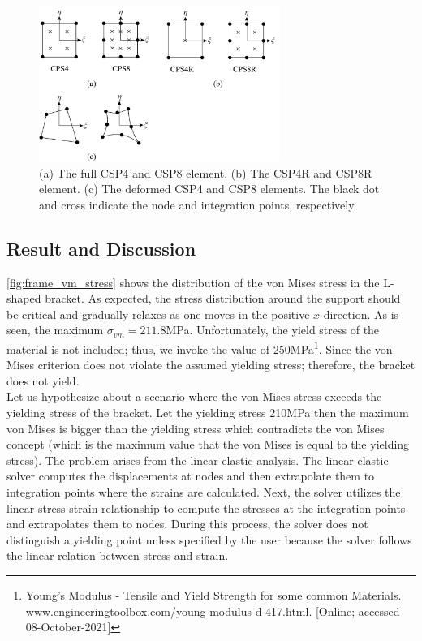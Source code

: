 \documentclass{article}
\begin{document}
\begin{figure}[H]
    \centering
    \includegraphics[width = 0.7\textwidth ]{figures/element.pdf}
    \caption{(a) The full CSP4 and CSP8 element. (b) The CSP4R and CSP8R element. (c) The deformed CSP4 and CSP8 elements. The black dot and cross indicate the node and integration points, respectively.}
    \label{fig:element}
\end{figure}

\subsection{Result and Discussion}
\cref{fig:frame_vm_stress} shows the distribution of the von Mises stress in the L-shaped bracket. As expected, the stress distribution around the support should be critical and gradually relaxes as one moves in the positive $x$-direction. As is seen, the maximum $\sigma_{vm} = 211.8$MPa. Unfortunately, the yield stress of the material is not included; thus, we invoke the value of 250MPa\footnote{Young's Modulus - Tensile and Yield Strength for some common Materials. www.engineeringtoolbox.com/young-modulus-d-417.html. [Online; accessed 08-October-2021]}. Since the von Mises criterion does not violate the assumed yielding stress; therefore, the bracket does not yield. \\

Let us hypothesize about a scenario where the von Mises stress exceeds the yielding stress of the bracket. Let the yielding stress 210MPa then the maximum von Mises is bigger than the yielding stress which contradicts the von Mises concept (which is the maximum value that the von Mises is equal to the yielding stress). The problem arises from the linear elastic analysis. The linear elastic solver computes the displacements at nodes and then extrapolate them to integration points where the strains are calculated. Next, the solver utilizes the linear stress-strain relationship to compute the stresses at the integration points and extrapolates them to nodes. During this process, the solver does not distinguish a yielding point unless specified by the user because the solver follows the linear relation between stress and strain. \\
\end{document}
